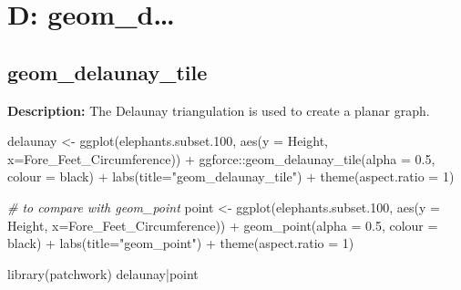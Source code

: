 \documentclass[
]{book}
\newenvironment{Shaded}{\begin{snugshade}}{\end{snugshade}}
\newcommand{\AttributeTok}[1]{\textcolor[rgb]{0.77,0.63,0.00}{#1}}
\newcommand{\CommentTok}[1]{\textcolor[rgb]{0.56,0.35,0.01}{\textit{#1}}}
\newcommand{\DecValTok}[1]{\textcolor[rgb]{0.00,0.00,0.81}{#1}}
\newcommand{\FloatTok}[1]{\textcolor[rgb]{0.00,0.00,0.81}{#1}}
\newcommand{\FunctionTok}[1]{\textcolor[rgb]{0.00,0.00,0.00}{#1}}
\newcommand{\NormalTok}[1]{#1}
\newcommand{\OtherTok}[1]{\textcolor[rgb]{0.56,0.35,0.01}{#1}}
\newcommand{\SpecialCharTok}[1]{\textcolor[rgb]{0.00,0.00,0.00}{#1}}
\newcommand{\StringTok}[1]{\textcolor[rgb]{0.31,0.60,0.02}{#1}}
\begin{document}
\hypertarget{d-geom_d}{%
\chapter{D: geom\_d\ldots{}}\label{d-geom_d}}

\hypertarget{geom_delaunay_tile}{%
\section{geom\_delaunay\_tile}\label{geom_delaunay_tile}}

\textbf{Description:} The Delaunay triangulation is used to create a planar graph.

\begin{Shaded}
\begin{Highlighting}[]
\NormalTok{delaunay }\OtherTok{\textless{}{-}} \FunctionTok{ggplot}\NormalTok{(elephants.subset}\FloatTok{.100}\NormalTok{, }\FunctionTok{aes}\NormalTok{(}\AttributeTok{y =}\NormalTok{ Height, }\AttributeTok{x=}\NormalTok{Fore\_Feet\_Circumference)) }\SpecialCharTok{+}
\NormalTok{  ggforce}\SpecialCharTok{::}\FunctionTok{geom\_delaunay\_tile}\NormalTok{(}\AttributeTok{alpha =} \FloatTok{0.5}\NormalTok{, }\AttributeTok{colour =} \StringTok{\textquotesingle{}black\textquotesingle{}}\NormalTok{) }\SpecialCharTok{+} \FunctionTok{labs}\NormalTok{(}\AttributeTok{title=}\StringTok{"geom\_delaunay\_tile"}\NormalTok{) }\SpecialCharTok{+} \FunctionTok{theme}\NormalTok{(}\AttributeTok{aspect.ratio =} \DecValTok{1}\NormalTok{)}

\CommentTok{\# to compare with geom\_point}
\NormalTok{point }\OtherTok{\textless{}{-}} \FunctionTok{ggplot}\NormalTok{(elephants.subset}\FloatTok{.100}\NormalTok{, }\FunctionTok{aes}\NormalTok{(}\AttributeTok{y =}\NormalTok{ Height, }\AttributeTok{x=}\NormalTok{Fore\_Feet\_Circumference)) }\SpecialCharTok{+}
  \FunctionTok{geom\_point}\NormalTok{(}\AttributeTok{alpha =} \FloatTok{0.5}\NormalTok{, }\AttributeTok{colour =} \StringTok{\textquotesingle{}black\textquotesingle{}}\NormalTok{) }\SpecialCharTok{+} \FunctionTok{labs}\NormalTok{(}\AttributeTok{title=}\StringTok{"geom\_point"}\NormalTok{) }\SpecialCharTok{+} \FunctionTok{theme}\NormalTok{(}\AttributeTok{aspect.ratio =} \DecValTok{1}\NormalTok{)}

\FunctionTok{library}\NormalTok{(patchwork)}
\NormalTok{delaunay}\SpecialCharTok{|}\NormalTok{point}
\end{Highlighting}
\end{Shaded}
\end{document}
